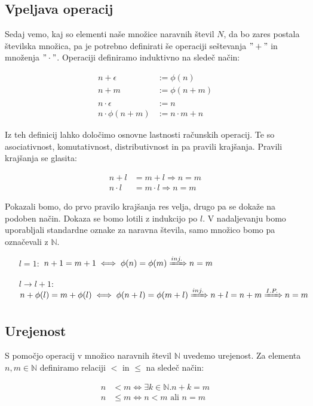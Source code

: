 \documentclass[12pt, a4paper]{article}
\begin{document}
\subsection{Vpeljava operacij}

Sedaj vemo, kaj so elementi naše množice naravnih števil $N$, da bo zares postala številska množica, pa je potrebno definirati še operaciji seštevanja $"+"$ in množenja $"\cdot"$. Operaciji definiramo induktivno na sledeč način:

\begin{align*}
n+\epsilon&:=\phi(n) \\
n+m&:=\phi(n+m)\\
&\\
n\cdot \epsilon &:= n \\
n\cdot \phi(n+m)&:=n\cdot m + n
\end{align*}

Iz teh definicij lahko določimo osnovne lastnosti računskih operacij. Te so asociativnost, komutativnost, distributivnost in pa pravili krajšanja. Pravili krajšanja se glasita:

\begin{align*}
 n+l &= m+l\Rightarrow n=m \\
n\cdot l &= m\cdot l \Rightarrow n=m
\end{align*}

Pokazali bomo, do prvo pravilo krajšanja res velja, drugo pa se dokaže na podoben način. Dokaza se bomo lotili z indukcijo po $l$. V nadaljevanju bomo uporabljali standardne oznake za naravna števila, samo množico bomo pa označevali z $\mathbb{N}$.

\begin{itemize}
\item[$l=1:$] $n+1 = m+1  \iff \phi(n) = \phi(m) \xRightarrow{inj.} n=m$ \checkmark
\item[$l\rightarrow l+1:$] $n+\phi(l)=m+\phi(l) \iff \phi(n+l) = \phi(m+l) \xRightarrow{inj.} n+l = n+m \xRightarrow{I.P.} n=m$ \checkmark
\end{itemize}

\subsection{Urejenost}

S pomočjo operacij v množico naravnih števil $\mathbb{N}$ uvedemo urejenost. Za elementa $n,m\in \mathbb{N}$ definiramo relaciji $<$ in $\leq$ na sledeč način:

\begin{align*}
n&<m \iff \exists k\in \mathbb{N}. n+k=m \\
n&\leq m \iff n<m\text{ ali }n=m
\end{align*}
\end{document}
